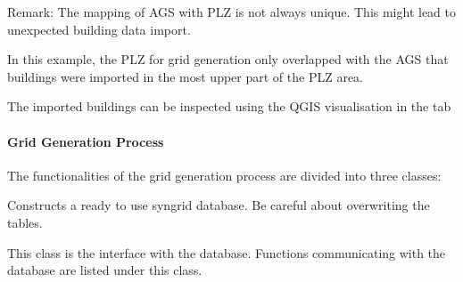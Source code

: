 \documentclass[letterpaper,10pt,english]{sphinxmanual}
\let\sphinxpxdimen\pdfpxdimen\else\newdimen\sphinxpxdimen
\begin{document}
\sphinxAtStartPar
Remark: The mapping of AGS with PLZ is not always unique. This might lead to unexpected building data import.

\sphinxAtStartPar
In this example, the PLZ for grid generation only overlapped with the AGS that buildings were imported in the most upper
part of the PLZ area.

\noindent\sphinxincludegraphics[width=500\sphinxpxdimen]{{ags_plz_mismatch}.png}

\sphinxAtStartPar
The imported buildings can be inspected using the QGIS visualisation {\hyperref[\detokenize{visualisation/qgis/qgis::doc}]{}} in the
 tab

\sphinxstepscope


\paragraph{Grid Generation Process}
\label{\detokenize{grid_generation/explanation/grid_generation_process:grid-generation-process}}\label{\detokenize{grid_generation/explanation/grid_generation_process::doc}}
\sphinxAtStartPar
The functionalities of the grid generation process are divided into three classes:

\begin{fulllineitems}
\label{\detokenize{grid_generation/explanation/grid_generation_process:syngrid.SyngridDatabaseConstructor.SyngridDatabaseConstructor}}
\pysigstartsignatures
{}
\pysigstopsignatures
\sphinxAtStartPar
Constructs a ready to use syngrid database. Be careful about overwriting the tables.

\end{fulllineitems}


\begin{fulllineitems}
\label{\detokenize{grid_generation/explanation/grid_generation_process:syngrid.pgReaderWriter.PgReaderWriter}}
\pysigstartsignatures
{}
\pysigstopsignatures
\sphinxAtStartPar
This class is the interface with the database. Functions communicating with the database
are listed under this class.

\end{fulllineitems}
\end{document}

